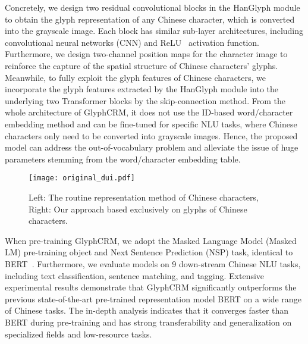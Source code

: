 Concretely, we design two residual convolutional blocks in the HanGlyph module to obtain the glyph representation of any Chinese character, which is converted into the grayscale image. Each block has similar sub-layer architectures, including convolutional neural networks (CNN) and ReLU~\cite{relu} activation function. Furthermore, we design two-channel position maps for the character image to reinforce the capture of the spatial structure of Chinese characters' glyphs. Meanwhile, to fully exploit the glyph features of Chinese characters, we incorporate the glyph features extracted by the HanGlyph module into the underlying two Transformer blocks by the skip-connection method. From the whole architecture of GlyphCRM, it does not use the ID-based word/character embedding method and can be fine-tuned for specific NLU tasks, where Chinese characters only need to be converted into grayscale images. Hence, the proposed model can address the out-of-vocabulary problem and alleviate the issue of huge parameters stemming from the word/character embedding table. 

\begin{figure}[t]
    \centering
    \texttt{[image: original\_dui.pdf]}
    \caption{Left: The routine representation method of Chinese characters, Right: Our approach based exclusively on glyphs of Chinese characters.}
    \label{fig:charater_2}
\end{figure}

When pre-training GlyphCRM, we adopt the Masked Language Model (Masked LM) pre-training object and Next Sentence Prediction (NSP) task, identical to BERT~\cite{devlin-etal-2019-bert}. Furthermore, we evaluate models on 9 down-stream Chinese NLU tasks, including text classification, sentence matching, and tagging. Extensive experimental results demonstrate that GlyphCRM significantly outperforms the previous state-of-the-art pre-trained representation model BERT on a wide range of Chinese tasks. The in-depth analysis indicates that it converges faster than BERT during pre-training and has strong transferability and generalization on specialized fields and low-resource tasks.      

